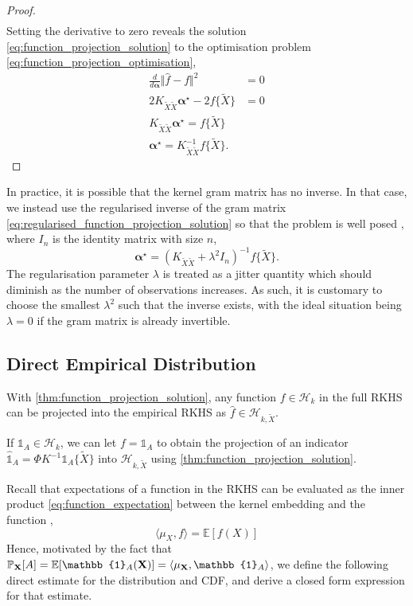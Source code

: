 \documentclass[twoside]{article} \usepackage{aistats2017}
\theoremstyle{definition}
\theoremstyle{theorem}
\newcommand{\rv}[1]{{#1}}
\newcommand{\ds}[1]{\tilde{#1}}
\newcommand{\expect}[1]{{\mathbb{E}[#1]}}
\newcommand{\inner}[2]{{\langle #1, #2 \rangle}}
\newcommand{\muX}{\mu_{\rv{X}}}
\begin{document}
\begin{proof}
\begin{align*}
			\end{align*}
			Setting the derivative to zero reveals the solution \eqref{eq:function_projection_solution} to the optimisation problem \eqref{eq:function_projection_optimisation},
			\begin{align*}
				\frac{d}{d \bm{\alpha}} \Vert \hat{f} - f \Vert^{2} &= 0 \\
				2 K_{\ds{X} \ds{X}}  \bm{\alpha}^{\star} - 2 f\{\ds{X}\} &= 0 \\
				K_{\ds{X} \ds{X}}  \bm{\alpha}^{\star} = f\{\ds{X}\} \\
				\bm{\alpha}^{\star} = K_{\ds{X} \ds{X}}^{-1} f\{\ds{X}\}.
			\end{align*}
		\end{proof}
		
		In practice, it is possible that the kernel gram matrix has no inverse. In that case, we instead use the regularised inverse of the gram matrix \eqref{eq:regularised_function_projection_solution} so that the problem is well posed \citep{muandet2016kernel}, where $I_{n}$ is the identity matrix with size $n$,
		\begin{equation}
			\bm{\alpha}^{\star} = (K_{\ds{X} \ds{X}} + \lambda^{2} I_{n})^{-1} f\{\ds{X}\}.
		\label{eq:regularised_function_projection_solution}
		\end{equation}
		The regularisation parameter $\lambda$ is treated as a jitter quantity which should diminish as the number of observations increases. As such, it is customary to choose the smallest $\lambda^{2}$ such that the inverse exists, with the ideal situation being $\lambda = 0$ if the gram matrix is already invertible. 

	\subsection{Direct Empirical Distribution}
	\label{sec:direct_quantile_regression:direct_empirical_distribution}

		With \cref{thm:function_projection_solution}, any function $f \in \mathcal{H}_{k}$ in the full RKHS can be projected into the empirical RKHS as $\hat{f} \in \mathcal{H}_{k, \ds{X}}$.
		
		If $\mathbb{1}_{A} \in \mathcal{H}_{k}$, we can let $f = \mathbb{1}_{A}$ to obtain the projection of an indicator $\hat{\mathbb{1}}_{A} = \Phi K^{-1} \mathbb{1}_{A}\{\ds{X}\}$ into $\mathcal{H}_{k, \ds{X}}$ using \cref{thm:function_projection_solution}.

		Recall that expectations of a function in the RKHS can be evaluated as the inner product \eqref{eq:function_expectation} between the kernel embedding and the function \citep{muandet2016kernel},
		\begin{equation}
			\inner{\muX}{f} = \expect{f(\rv{X})}
		\label{eq:function_expectation}
		\end{equation}
		Hence, motivated by the fact that $\mathbb{P}_{\bvec{\rv{X}}}[A] = \expect{\mathbb{1}_{A}(\bvec{\rv{X}})} = \inner{\mu_{\bvec{\rv{X}}}}{\mathbb{1}_{A}}$, we define the following direct estimate for the distribution and CDF, and derive a closed form expression for that estimate.
		
\end{document}
